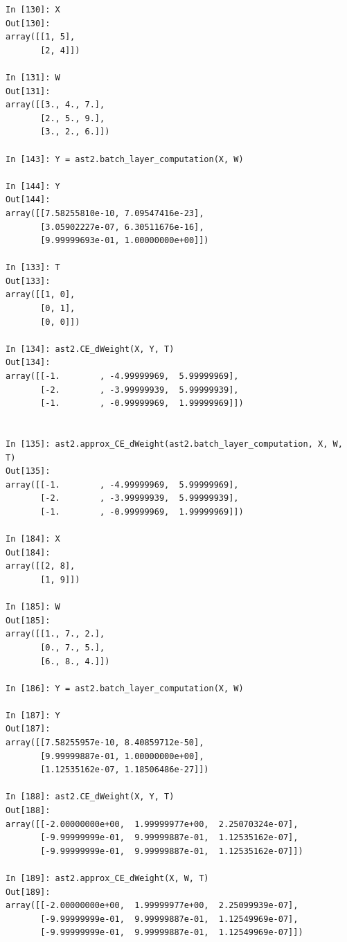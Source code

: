 \documentclass[12pt]{article}
\begin{document}
\begin{lstlisting}
In [130]: X
Out[130]: 
array([[1, 5],
       [2, 4]])

In [131]: W
Out[131]: 
array([[3., 4., 7.],
       [2., 5., 9.],
       [3., 2., 6.]])

In [143]: Y = ast2.batch_layer_computation(X, W)

In [144]: Y
Out[144]: 
array([[7.58255810e-10, 7.09547416e-23],
       [3.05902227e-07, 6.30511676e-16],
       [9.99999693e-01, 1.00000000e+00]])

In [133]: T
Out[133]: 
array([[1, 0],
       [0, 1],
       [0, 0]])

In [134]: ast2.CE_dWeight(X, Y, T)
Out[134]: 
array([[-1.        , -4.99999969,  5.99999969],
       [-2.        , -3.99999939,  5.99999939],
       [-1.        , -0.99999969,  1.99999969]])


In [135]: ast2.approx_CE_dWeight(ast2.batch_layer_computation, X, W, T)
Out[135]: 
array([[-1.        , -4.99999969,  5.99999969],
       [-2.        , -3.99999939,  5.99999939],
       [-1.        , -0.99999969,  1.99999969]])

In [184]: X
Out[184]: 
array([[2, 8],
       [1, 9]])

In [185]: W
Out[185]: 
array([[1., 7., 2.],
       [0., 7., 5.],
       [6., 8., 4.]])

In [186]: Y = ast2.batch_layer_computation(X, W)

In [187]: Y
Out[187]: 
array([[7.58255957e-10, 8.40859712e-50],
       [9.99999887e-01, 1.00000000e+00],
       [1.12535162e-07, 1.18506486e-27]])

In [188]: ast2.CE_dWeight(X, Y, T)
Out[188]: 
array([[-2.00000000e+00,  1.99999977e+00,  2.25070324e-07],
       [-9.99999999e-01,  9.99999887e-01,  1.12535162e-07],
       [-9.99999999e-01,  9.99999887e-01,  1.12535162e-07]])

In [189]: ast2.approx_CE_dWeight(X, W, T)
Out[189]: 
array([[-2.00000000e+00,  1.99999977e+00,  2.25099939e-07],
       [-9.99999999e-01,  9.99999887e-01,  1.12549969e-07],
       [-9.99999999e-01,  9.99999887e-01,  1.12549969e-07]])
\end{lstlisting}

\end{document}
